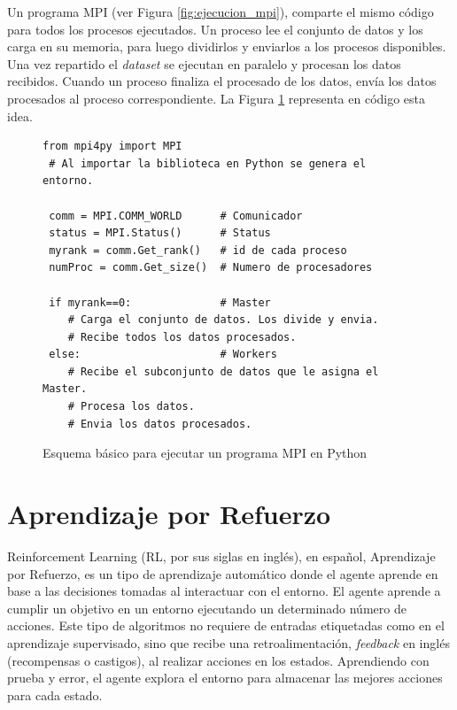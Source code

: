 	\vspace{-0.2cm}
	
	Un programa MPI (ver Figura \ref{fig:ejecucion_mpi}), comparte el mismo código para todos los procesos ejecutados. Un proceso lee el conjunto de datos y los carga en su memoria, para luego dividirlos y enviarlos a los procesos disponibles. Una vez repartido el \textit{dataset} se ejecutan en paralelo y procesan los datos recibidos. Cuando un proceso finaliza el procesado de los datos, envía los datos procesados al proceso correspondiente. La Figura \ref{fig:esquema_mpi} representa en código esta idea.
	
	\vspace{-0.1cm}

	\begin{figure}[!h]
		
		\begin{lstlisting}[frame=single]
 from mpi4py import MPI 
 # Al importar la biblioteca en Python se genera el entorno.

 comm = MPI.COMM_WORLD     	# Comunicador
 status = MPI.Status()   	# Status
 myrank = comm.Get_rank() 	# id de cada proceso
 numProc = comm.Get_size() 	# Numero de procesadores

 if myrank==0:           	# Master
    # Carga el conjunto de datos. Los divide y envia.
    # Recibe todos los datos procesados.
 else:                   	# Workers
    # Recibe el subconjunto de datos que le asigna el Master.
    # Procesa los datos.
    # Envia los datos procesados.
		\end{lstlisting}
		\caption{Esquema básico para ejecutar un programa MPI en Python}
		\label{fig:esquema_mpi}
	\end{figure}
	
	\newpage

\section{Aprendizaje por Refuerzo}

	Reinforcement Learning (RL, por sus siglas en inglés), en español, Aprendizaje por Refuerzo, es un tipo de aprendizaje automático donde el agente aprende en base a las decisiones tomadas al interactuar con el entorno. El agente aprende a cumplir un objetivo en un entorno ejecutando un determinado número de acciones. Este tipo de algoritmos no requiere de entradas etiquetadas como en el aprendizaje supervisado, sino que recibe una retroalimentación, \textit{feedback} en inglés (recompensas o castigos), al realizar acciones en los estados. Aprendiendo con prueba y error, el agente explora el entorno para almacenar las mejores acciones para cada estado. 

